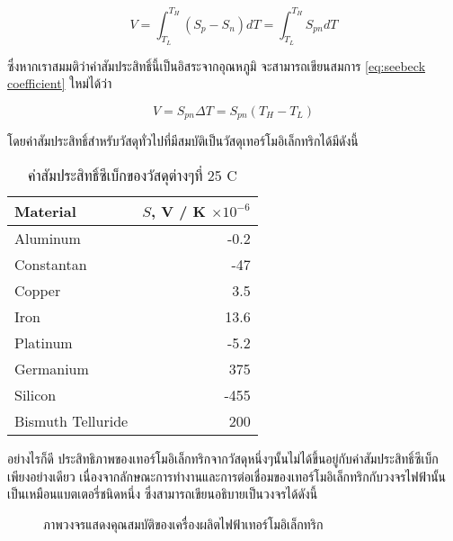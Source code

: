 \documentclass[11pt]{article}
\begin{document}
\begin{equation}
  \label{eq:seebeck coefficient}
  V = \int_{T_L}^{T_H} \left( S_p - S_n \right) dT = \int_{T_L}^{T_H} S_{pn} dT
\end{equation}

ซึ่งหากเราสมมติว่าค่าสัมประสิทธิ์นี้เป็นอิสระจากอุณหภูมิ จะสามารถเขียนสมการ \ref{eq:seebeck coefficient} ใหม่ได้ว่า

\begin{equation}
  \label{eq:seebeck coefficient2}
  V = S_{pn} \Delta T = S_{pn} \left( T_H - T_L \right)
\end{equation}

โดยค่าสัมประสิทธิ์สำหรับวัสดุทั่วไปที่มีสมบัติเป็นวัสดุเทอร์โมอิเล็กทริกได้มีดังนี้

\begin{table}[htbp]
\caption{\label{tab:org8ebcf41}
ค่าสัมประสิทธิ์ซีเบ็กของวัสดุต่างๆที่ 25 C}
\centering
\begin{tabular}{lr}
\hline
Material & \(S\), V / K \(\times 10^{-6}\)\\
\hline
Aluminum & -0.2\\
Constantan & -47\\
Copper & 3.5\\
Iron & 13.6\\
Platinum & -5.2\\
Germanium & 375\\
Silicon & -455\\
Bismuth Telluride & 200\\
\hline
\end{tabular}
\end{table}

อย่างไรก็ดี ประสิทธิภาพของเทอร์โมอิเล็กทริกจากวัสดุหนึ่งๆนั้นไม่ได้ขึ้นอยู่กับค่าสัมประสิทธิ์ซีเบ็กเพียงอย่างเดียว เนื่องจากลักษณะการทำงานและการต่อเชื่อมของเทอร์โมอิเล็กทริกกับวงจรไฟฟ้านั้นเป็นเหมือนแบตเตอรี่ชนิดหนึ่ง ซึ่งสามารถเขียนอธิบายเป็นวงจรได้ดังนี้

\begin{figure}[h]
  \centering
  \caption{ภาพวงจรแสดงคุณสมบัติของเครื่องผลิตไฟฟ้าเทอร์โมอิเล็กทริก}
  \label{fig:thermoelectric circuit}
\end{figure}
\end{document}
